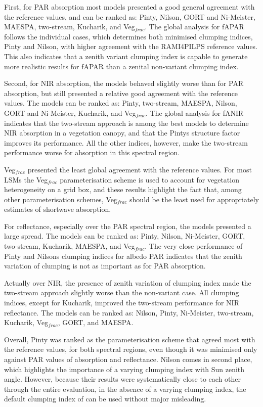 First, for PAR absorption most models presented a good general agreement with the reference values, and can be ranked as: Pinty, Nilson, GORT and Ni-Meister, MAESPA, two-stream, Kucharik, and Veg$_{frac}$. The global analysis for fAPAR follows the individual cases, which determines both minimised clumping indices, Pinty and Nilson, with higher agreement with the RAMI4PILPS reference values. This also indicates that a zenith variant clumping index is capable to generate more realistic results for fAPAR than a zenital non-variant clumping index.

Second, for NIR absorption, the models behaved slightly worse than for PAR absorption, but still presented a relative good agreement with the reference values. The models can be ranked as: Pinty, two-stream, MAESPA, Nilson, GORT and Ni-Meister, Kucharik, and Veg$_{frac}$. The global analysis for fANIR indicates that the two-stream approach is among the best models to determine NIR absorption in a vegetation canopy, and that the Pinty\textsinglequote s structure factor improves its performance. All the other indices, however, make the two-stream performance worse for absorption in this spectral region.

Veg$_{frac}$ presented the least global agreement with the reference values. For most LSMs the Veg$_{frac}$ parameterisation scheme is used to account for vegetation heterogeneity on a grid box, and these results highlight the fact that, among other parameterisation schemes, Veg$_{frac}$ should be the least used for appropriately estimates of shortwave absorption.

For reflectance, especially over the PAR spectral region, the models presented a large spread. The models can be ranked as: Pinty, Nilson, Ni-Meister, GORT, two-stream, Kucharik, MAESPA, and Veg$_{frac}$. The very close performance of Pinty and Nilson\textsinglequote s clumping indices for albedo PAR indicates that the zenith variation of clumping is not as important as for PAR absorption.

Actually over NIR, the presence of zenith variation of clumping index made the two-stream approach slightly worse than the non-variant case. All clumping indices, except for Kucharik, improved the two-stream performance for NIR reflectance. The models can be ranked as: Nilson, Pinty, Ni-Meister, two-stream, Kucharik, Veg$_{frac}$, GORT, and MAESPA.

Overall, Pinty was ranked as the parameterisation scheme that agreed most with the reference values, for both spectral regions, even though it was minimised only against PAR values of absorption and reflectance. Nilson comes in second place, which highlights the importance of a varying clumping index with Sun zenith angle. However, because their results were systematically close to each other through the entire evaluation, in the absence of a varying clumping index, the default clumping index of \citet{Nilson1971} can be used without major misleading.


